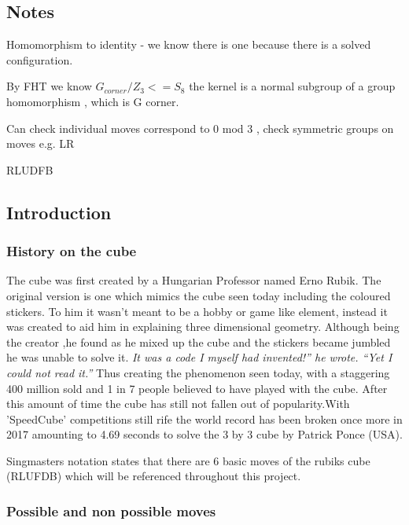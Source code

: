 \documentclass{article}
\begin{document}
 
\subsection*{Notes}	
Homomorphism to identity - we know there is one because there is a solved configuration.\newline

By FHT we know $G_{corner}/Z_{3} <= S_{8}$ the kernel is a normal subgroup of a group homomorphism , which is G corner.\newline

Can check individual moves correspond to 0 mod 3 , check symmetric groups on moves e.g. LR

RLUDFB

\subsection*{Introduction}

\paragraph*{}
\subsubsection*{History on the cube}
The cube was first created by a Hungarian Professor named Erno Rubik. The original version is one which mimics the cube seen today including the coloured stickers. To him it wasn't meant to be a hobby or game like element, instead it was created to aid him in explaining three dimensional geometry. Although being the creator ,he found as he mixed up the cube and the stickers became jumbled he was unable to solve it.
\textit{It was a code I myself had invented!” he wrote. “Yet I could not read it.”}
Thus creating the phenomenon seen today, with a staggering 400 million sold and  1 in 7 people believed to have played with the cube. After this amount of time the cube has still not fallen out of popularity.With 'SpeedCube' competitions still rife the world record has been broken once more in 2017 amounting to 4.69 seconds to solve the 3 by 3 cube by Patrick Ponce (USA).%

Singmasters %
notation states that there are 6 basic moves of the rubiks cube (RLUFDB) which will be referenced throughout this project.
\subsubsection*{Possible and non possible moves}
\end{document}
